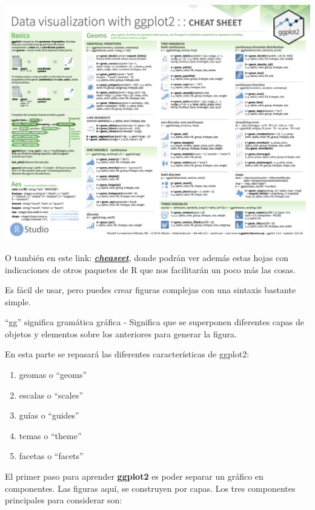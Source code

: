 \documentclass[
]{book}
\begin{document}
\hfill\break

\begin{center}\includegraphics[width=500pt]{images//ggplot} \end{center}

\hfill\break

O también en este link: \href{https://www.rstudio.com/resources/cheatsheets/}{\textbf{\emph{cheaseet}}}, donde podrán ver además estas hojas con indicaciones de otros paquetes de R que nos facilitarán un poco más las cosas.

Es fácil de usar, pero puedes crear figuras complejas con una sintaxis bastante simple.

``gg'' significa gramática gráfica - Significa que se superponen diferentes capas de objetos y elementos sobre los anteriores para generar la figura.

En esta parte se repasará las diferentes características de ggplot2:

\begin{enumerate}
\def\labelenumi{\arabic{enumi}.}
\item
  geomas o ``geoms''
\item
  escalas o ``scales''
\item
  guías o ``guides''
\item
  temas o ``theme''
\item
  facetas o ``facets''
\end{enumerate}

El primer paso para aprender \textbf{ggplot2} es poder separar un gráfico en componentes.
Las figuras aquí, se construyen por capas.
Los tres componentes principales para considerar son:
\end{document}
